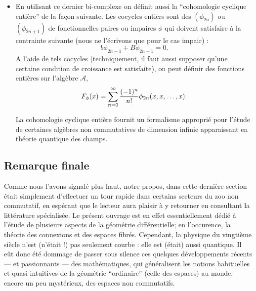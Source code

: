 \begin{itemize}
\begin{itemize}
 \end{itemize}
 
On montre alors que  $B$ envoie $ C^n $ sur $ C^{n-1}  $, que
$   B^2 = 0$ et que   $bB+Bb=0.$  En utilisant ces deux derni\`eres 
propri\'et\'es, ainsi que  $b^2=0 $,    on peut construire un bi-complexe 
(puisque $  b $   and  $  B $  agissent dans des directions oppos\'ees) 
\`a partir duquel on peut \'egalement d\'efinir la cohomologie cyclique.

\item 

 En utilisant ce dernier bi-complexe on d\'efinit aussi la  ``cohomologie 
 cyclique enti\`ere'' de la fa\c con suivante. Les cocycles entiers sont des 
   $  (\phi_{2n}) $  
ou $  (\phi_{2n+1}) $   de fonctionnelles paires ou impaires  $  \phi $   
qui doivent satisfaire \`a la contrainte suivante (nous ne l'\'ecrivons 
que pour le cas impair) :   $$      b \phi_{2n-1} +
B\phi_{2n+1} = 0  .$$    A l'aide de tels cocycles (techniquement, il 
faut aussi supposer qu'une certaine condition de croissance est 
satisfaite), on peut d\'efinir des fonctions enti\`eres sur l'alg\`ebre $  
{\mathcal A} $,  $$     F_\phi(x) =
\sum_{n=0}^\infty {(-1)^n \over n!} \phi_{2n}(x,x,\ldots,x) .$$    

La cohomologie cyclique enti\`ere fournit un formalisme 
appropri\'e pour l'\'etude de certaines alg\`ebres non commutatives de 
dimension infinie apparaissant en th\'eorie quantique des champs.

\end{itemize}

\subsection{ Remarque finale}
Comme nous l'avons signal\'e plus haut, 
notre propos, dans cette derni\`ere section \'etait simplement d'effectuer un tour rapide dans certains secteurs du 
zoo non commutatif, en esp\'erant que le lecteur aura plaisir \`a y 
retourner en consultant la litt\'erature sp\'ecialis\'ee. 
Le pr\'esent ouvrage est en effet essentiellement d\'edi\'e \`a l'\'etude de 
plusieurs aspects de la g\'eom\'etrie diff\'erentielle;  en 
l'occurence, la th\'eorie des connexions et des espaces fibr\'es.
Cependant, la physique du vingti\`eme si\`ecle n'est  (n'\'etait !)  pas seulement courbe : elle est (\'etait) aussi quantique.
Il e\^ut donc \'et\'e  dommage de passer sous silence ces quelques 
d\'eveloppements r\'ecents --- et passionnants --- des 
math\'ematiques, qui g\'en\'eralisent les notions habituelles et quasi intuitives de la g\'eom\'etrie 
``ordinaire'' (celle des espaces) au monde, encore un peu 
myst\'erieux, des espaces non commutatifs.

